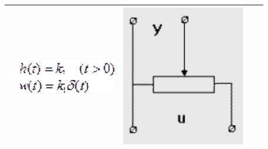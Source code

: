 \documentclass[14pt,a4paper,report]{report}
\begin{document}
\begin{table}[h!]
\begin{tabular}{ | m{3cm} | m{2.5cm} | m{4.5cm} | m{2.5cm} | m{2.5cm} }
\begin{minipage}{.3\textwidth}
		\end{minipage}
		&
		\begin{minipage}{.3\textwidth}
			\includegraphics[scale = 0.5]{images/1_4.png}
		\end{minipage}
		&
		\begin{minipage}{.3\textwidth}
			\includegraphics[scale = 0.5]{images/1_5.png}
		\end{minipage} \\ \hline
		

\end{tabular}
\end{table}
\end{document}
